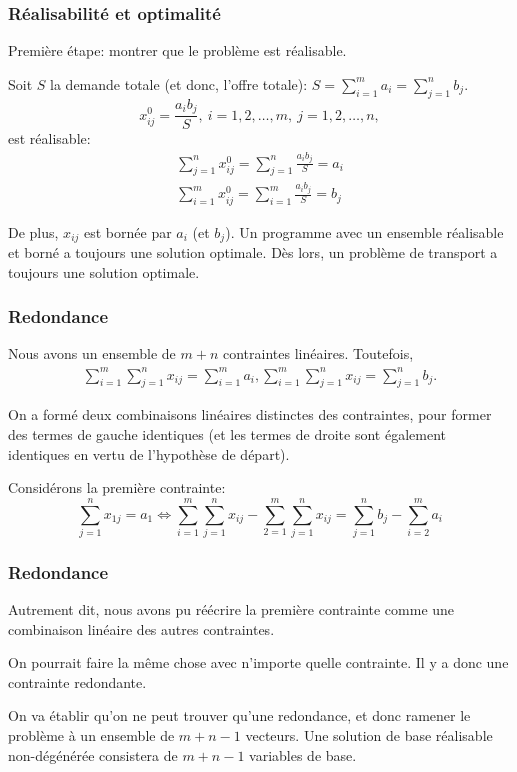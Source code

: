 \documentclass[usepdftitle=false]{beamer}
\begin{document}
\begin{frame}
\frametitle{Réalisabilité et optimalité}

Première étape: montrer que le problème est réalisable.

\mbox{}

Soit $S$ la demande totale (et donc, l'offre totale): $S = \sum_{i = 1}^m a_i = \sum_{j = 1}^n b_j$.
\[
x^0_{ij} = \frac{a_ib_j}{S},\ i=1,2,\ldots,m,\ j = 1,2,\ldots,n,
\]
est réalisable:
\begin{align*}
\sum_{j = 1}^n x^0_{ij} = \sum_{j = 1}^n \frac{a_ib_j}{S} = a_i \\
\sum_{i = 1}^m x^0_{ij} = \sum_{i = 1}^m \frac{a_ib_j}{S} = b_j
\end{align*}

\mbox{}

De plus, $x_{ij}$ est bornée par $a_i$ (et $b_j$).
Un programme avec un ensemble réalisable et borné a toujours une solution optimale. Dès lors, un problème de transport a toujours une solution optimale.

\end{frame}

\begin{frame}
\frametitle{Redondance}

Nous avons un ensemble de $m+n$ contraintes linéaires. Toutefois,
\begin{align*}
\sum_{i = 1}^m \sum_{j = 1}^n x_{ij} = \sum_{i = 1}^m a_i,
\sum_{i = 1}^m \sum_{j = 1}^n x_{ij} = \sum_{j = 1}^n b_j.
\end{align*}

\mbox{}

On a formé deux combinaisons linéaires distinctes des contraintes, pour former des termes de gauche identiques (et les termes de droite sont également identiques en vertu de l'hypothèse de départ).

\mbox{}

Considérons la première contrainte:
\[
\sum_{j = 1}^n x_{1j} = a_1
\Leftrightarrow
\sum_{i = 1}^m \sum_{j = 1}^n x_{ij} - 
\sum_{2 = 1}^m \sum_{j = 1}^n x_{ij}
= \sum_{j =1}^n b_j - \sum_{i = 2}^m a_i
\]

\end{frame}

\begin{frame}
\frametitle{Redondance}

Autrement dit, nous avons pu réécrire la première contrainte comme une combinaison linéaire des autres contraintes.

\mbox{}

On pourrait faire la même chose avec n'importe quelle contrainte. Il y a donc une contrainte redondante.

\mbox{}

On va établir qu'on ne peut trouver qu'une redondance, et donc ramener le problème à un ensemble de $m + n - 1$ vecteurs. Une solution de base réalisable non-dégénérée consistera de $m + n -1$ variables de base.

\end{frame}
\end{document}
